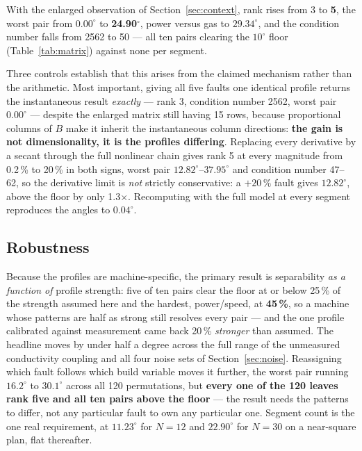 \documentclass[preprint,times]{elsarticle}
\begin{document}
With the enlarged observation of Section~\ref{sec:context}, rank rises from 3 to
\textbf{5}, the worst pair from $0.00^\circ$ to \textbf{24.90$^\circ$}, power
versus gas to $29.34^\circ$, and the condition number falls from 2562 to 50 ---
all ten pairs clearing the $10^\circ$ floor (Table~\ref{tab:matrix}) against none
per segment.

Three controls establish that this arises from the claimed mechanism rather than
the arithmetic. Most important, giving all five faults one identical profile
returns the instantaneous result \emph{exactly} --- rank 3, condition number 2562,
worst pair $0.00^\circ$ --- despite the enlarged matrix still having 15 rows,
because proportional columns of $B$ make it inherit the instantaneous column
directions: \textbf{the gain is not dimensionality, it is the profiles
differing}. Replacing every derivative by a secant through the full nonlinear
chain gives rank 5 at every magnitude from 0.2\,\% to 20\,\% in both signs, worst
pair $12.82^\circ$--$37.95^\circ$ and condition number 47--62, so the derivative
limit is \emph{not} strictly conservative: a $+20\,\%$ fault gives $12.82^\circ$,
above the floor by only 1.3$\times$. Recomputing with the full model at every
segment reproduces the angles to $0.04^\circ$.

\subsection{Robustness}
\label{sec:robust}

Because the profiles are machine-specific, the primary result is separability
\emph{as a function of} profile strength: five of ten pairs clear the floor at or
below 25\,\% of the strength assumed here and the hardest, power/speed, at
\textbf{45\,\%}, so a machine whose patterns are half as strong still resolves
every pair --- and the one profile calibrated against measurement came back
20\,\% \emph{stronger} than assumed. The headline moves by under half a degree
across the full range of the unmeasured conductivity coupling and all four
noise sets of Section~\ref{sec:noise}. Reassigning which fault follows which
build variable moves it further, the worst pair running $16.2^\circ$ to
$30.1^\circ$ across all 120 permutations, but \textbf{every one of the 120
leaves rank five and all ten pairs above the floor} --- the result needs the
patterns to differ, not any particular fault to own any particular one.
Segment count is the one real requirement, at $11.23^\circ$ for $N=12$ and
$22.90^\circ$ for $N=30$ on a near-square plan, flat thereafter.
\end{document}
